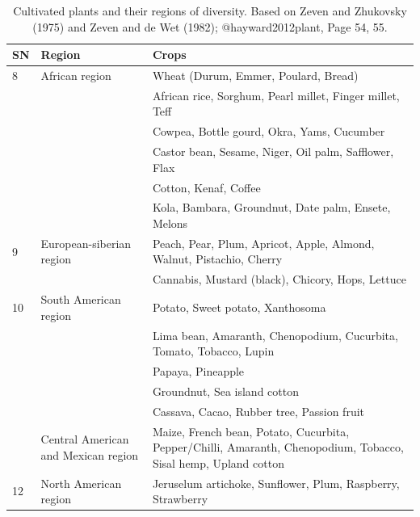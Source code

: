 \documentclass[ignorenonframetext,aspectratio=169]{beamer}
\begin{document}
\begin{frame}{}
\protect\hypertarget{section-13}{}

\begin{table}[t]

\caption{\label{tab:diversity-region3}Cultivated plants and their regions of diversity. Based on Zeven and Zhukovsky (1975) and Zeven and de Wet (1982); @hayward2012plant, Page 54, 55.}
\centering
\fontsize{6}{8}\selectfont
\begin{tabular}{>{\raggedright\arraybackslash}p{3em}>{\raggedright\arraybackslash}p{14em}>{\raggedright\arraybackslash}p{32em}}
\toprule
SN & Region & Crops\\
\midrule
\rowcolor{gray!6}  8 & African region & Wheat (Durum, Emmer, Poulard, Bread)\\
 &  & African rice, Sorghum, Pearl millet, Finger millet, Teff\\
\rowcolor{gray!6}   &  & Cowpea, Bottle gourd, Okra, Yams, Cucumber\\
 &  & Castor bean, Sesame, Niger, Oil palm, Safflower, Flax\\
\rowcolor{gray!6}   &  & Cotton, Kenaf, Coffee\\
\addlinespace
 &  & Kola, Bambara, Groundnut, Date palm, Ensete, Melons\\
\rowcolor{gray!6}  9 & European-siberian region & Peach, Pear, Plum, Apricot, Apple, Almond, Walnut, Pistachio, Cherry\\
 &  & Cannabis, Mustard (black), Chicory, Hops, Lettuce\\
\rowcolor{gray!6}  10 & South American region & Potato, Sweet potato, Xanthosoma\\
 &  & Lima bean, Amaranth, Chenopodium, Cucurbita, Tomato, Tobacco, Lupin\\
\addlinespace
\rowcolor{gray!6}   &  & Papaya, Pineapple\\
 &  & Groundnut, Sea island cotton\\
\rowcolor{gray!6}   &  & Cassava, Cacao, Rubber tree, Passion fruit\\
11 & Central American and Mexican region & Maize, French bean, Potato, Cucurbita, Pepper/Chilli, Amaranth, Chenopodium, Tobacco, Sisal hemp, Upland cotton\\
\rowcolor{gray!6}  12 & North American region & Jeruselum artichoke, Sunflower, Plum, Raspberry, Strawberry\\
\bottomrule
\end{tabular}
\end{table}

\end{frame}
\end{document}
